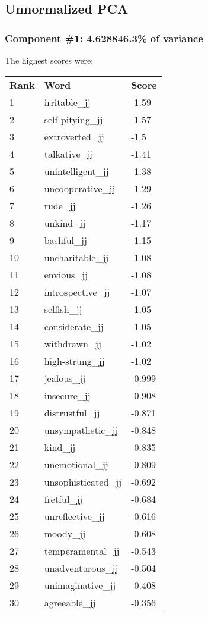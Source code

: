 \documentclass[10pt,letterpaper]{book}
\begin{document}
\subsection{Unnormalized PCA}



\subsubsection{Component \#1: 4.628846.3\% of variance}

The highest scores were:
\begin{tabular}{ l l l }
        \textbf{Rank} & \textbf{Word} & \textbf{Score} \\
        1 & irritable\_jj & -1.59 \\
        2 & self-pitying\_jj & -1.57 \\
        3 & extroverted\_jj & -1.5 \\
        4 & talkative\_jj & -1.41 \\
        5 & unintelligent\_jj & -1.38 \\
        6 & uncooperative\_jj & -1.29 \\
        7 & rude\_jj & -1.26 \\
        8 & unkind\_jj & -1.17 \\
        9 & bashful\_jj & -1.15 \\
        10 & uncharitable\_jj & -1.08 \\
        11 & envious\_jj & -1.08 \\
        12 & introspective\_jj & -1.07 \\
        13 & selfish\_jj & -1.05 \\
        14 & considerate\_jj & -1.05 \\
        15 & withdrawn\_jj & -1.02 \\
        16 & high-strung\_jj & -1.02 \\
        17 & jealous\_jj & -0.999 \\
        18 & insecure\_jj & -0.908 \\
        19 & distrustful\_jj & -0.871 \\
        20 & unsympathetic\_jj & -0.848 \\
        21 & kind\_jj & -0.835 \\
        22 & unemotional\_jj & -0.809 \\
        23 & unsophisticated\_jj & -0.692 \\
        24 & fretful\_jj & -0.684 \\
        25 & unreflective\_jj & -0.616 \\
        26 & moody\_jj & -0.608 \\
        27 & temperamental\_jj & -0.543 \\
        28 & unadventurous\_jj & -0.504 \\
        29 & unimaginative\_jj & -0.408 \\
        30 & agreeable\_jj & -0.356 \\
\end{tabular}
\end{document}
